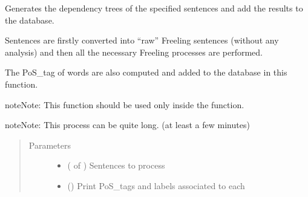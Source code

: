 \documentclass[letterpaper,10pt,english]{sphinxmanual}
\begin{document}
\begin{fulllineitems}
\label{\detokenize{process:loacore.process.deptree_process.add_dep_tree_from_sentences}}
Generates the dependency trees of the specified sentences and add the results to the
database.

Sentences are firstly converted into “raw” Freeling sentences (without any analysis) and then all the necessary
Freeling processes are performed.

The PoS\_tag of words are also computed and added to the database in this function.

\begin{sphinxadmonition}{note}{Note:}
This function should be used only inside the  function.
\end{sphinxadmonition}

\begin{sphinxadmonition}{note}{Note:}
This process can be quite long. (at least a few minutes)
\end{sphinxadmonition}
\begin{quote}\begin{description}
\item[{Parameters}] \leavevmode\begin{itemize}
\item {} 
 ( of {\hyperref[\detokenize{classes:loacore.classes.classes.Sentence}]{}}) \textendash{} Sentences to process

\item {} 
 () \textendash{} Print PoS\_tags and labels associated to each {\hyperref[\detokenize{classes:loacore.classes.classes.Word}]{}}

\end{itemize}

\end{description}\end{quote}

\end{fulllineitems}
\end{document}
